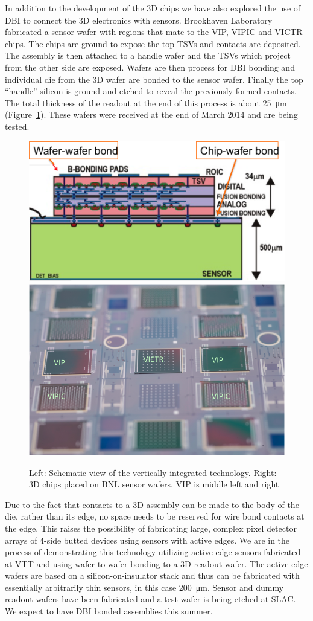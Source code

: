 In addition to the development of the 3D chips we have also explored the use of DBI to connect the 3D electronics with sensors.  Brookhaven Laboratory fabricated a sensor wafer with regions that mate to the VIP, VIPIC and VICTR chips.  The chips are ground to expose the top TSVs and contacts are deposited. The assembly is then attached to a handle wafer and the TSVs which project from the other side are exposed.  Wafers are then process for DBI bonding and individual die from the 3D wafer are bonded to the sensor wafer.  Finally the top ``handle'' silicon is ground and etched to reveal the previously formed contacts.  The total thickness of the readout at the end of this process is about \SI{25}{\micro\meter} (Figure~\ref{fig:VertexDetector:VIP:chipsOnBNLWafer}). These wafers were received at the end of March 2014 and are being tested.
\begin{figure}[hb]
    \centering
    \includegraphics[width=.495\textwidth]{VertexDetector/VIP/schematic}
    \includegraphics[width=.495\textwidth]{VertexDetector/VIP/3DChipsOnBNLWafers}
\caption{Left: Schematic view of the vertically integrated technology. Right: 3D chips placed on BNL sensor wafers. VIP is middle left and right}
\label{fig:VertexDetector:VIP:chipsOnBNLWafer}
\end{figure}
Due to the fact that contacts to a 3D assembly can be made to the body of the die, rather than its edge, no space needs to be reserved for wire bond contacts at the edge.  This raises the possibility of fabricating large, complex pixel detector arrays of 4-side butted devices using sensors with active edges.  We are in the process of demonstrating this technology utilizing active edge sensors fabricated at VTT and using wafer-to-wafer bonding to a 3D readout wafer. The active edge wafers are based on a silicon-on-insulator stack and thus can be fabricated with essentially arbitrarily thin sensors, in this case \SI{200}{\micro\meter}. Sensor and dummy readout wafers have been fabricated and a test wafer is being etched at SLAC. We expect to have DBI bonded assemblies this summer.

